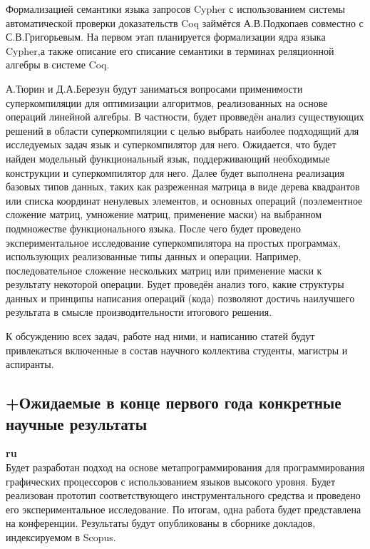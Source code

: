 \documentclass[12pt]{article}  %
\theoremstyle{remark}
\begin{document}
Формализацией семантики языка запросов Cypher с использованием системы автоматической проверки доказательств Coq займётся А.В.Подкопаев совместно с С.В.Григорьевым. На первом этап планируется формализации ядра языка Cypher,а также описание его списание семантики в терминах реляционной алгебры в системе Coq.

А.Тюрин и Д.А.Березун будут заниматься вопросами применимости суперкомпиляции для оптимизации алгоритмов, реализованных на основе операций линейной алгебры. В частности, будет провведён анализ существующих решений в области суперкомпиляции с целью выбрать наиболее подходящий для исследуемых задач язык и суперкомпилятор для него. Ожидается, что будет найден модельный функциональный язык, поддерживающий необходимые конструкции и суперкомпилятор для него. Далее будет выполнена реализация базовых типов данных, таких как разреженная матрица в виде дерева квадрантов или списка координат ненулевых элементов, и основных операций (поэлементное сложение матриц, умножение матриц, применение маски) на выбранном подмножестве функционального языка.
После чего будет проведено экспериментальное исследование суперкомпилятора на простых программах, использующих реализованные типы данных и операции. Например, последовательное сложение нескольких матриц или применение маски к результату некоторой операции. Будет проведён анализ того, какие структуры данных и принципы написания операций (кода) позволяют достичь наилучшего результата в смысле производительности итогового решения. 

К обсуждению всех задач, работе над ними, и написанию статей будут привлекаться включенные в состав научного коллектива студенты, магистры и аспиранты.

\subsection{+Ожидаемые в конце первого года конкретные научные результаты}

\textbf{ru}\\

Будет разработан подход на основе метапрограммирования для программирования графических процессоров с использованием языков высокого уровня. Будет реализован прототип соответствующего инструментального средства и проведено его экспериментальное исследование. По итогам, одна работа будет представлена на конференции. Результаты будут опубликованы в сборнике докладов, индексируемом в Scopus.
\end{document}
